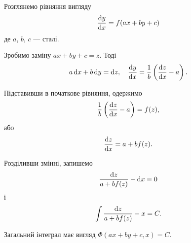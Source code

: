 Розглянемо рівняння вигляду
\begin{equation*}
	\frac{\mathop{}\!\mathrm{d} y}{\mathop{}\!\mathrm{d} x} = f(a x + b y + c)
\end{equation*}
де $a$, $b$, $c$ --- сталі. \parvskip

Зробимо заміну $a x + b y + c = z$. Тоді
\begin{equation*}
	a \mathop{}\!\mathrm{d} x + b \mathop{}\!\mathrm{d} y = \mathop{}\!\mathrm{d} z, \quad \frac{\mathop{}\!\mathrm{d} y}{\mathop{}\!\mathrm{d} x} = \frac1b \left( \frac{\mathop{}\!\mathrm{d} z}{\mathop{}\!\mathrm{d} x} - a \right).
\end{equation*}

Підставивши в початкове рівняння, одержимо
\begin{equation*}
	\frac1b \left( \frac{\mathop{}\!\mathrm{d} z}{\mathop{}\!\mathrm{d} x} - a \right) = f(z),
\end{equation*}
або
\begin{equation*}
	\frac{\mathop{}\!\mathrm{d} z}{\mathop{}\!\mathrm{d} x} = a + b f (z).
\end{equation*}

Розділивши змінні, запишемо
\begin{equation*}
	\frac{\mathop{}\!\mathrm{d} z}{a + b f (z)} - \mathop{}\!\mathrm{d} x = 0
\end{equation*}
і
\begin{equation*}
	\int \frac{\mathop{}\!\mathrm{d} z}{a + b f (z)} - x = C.
\end{equation*}

Загальний інтеграл має вигляд $\Phi(a x + b y + c, x) = C$.